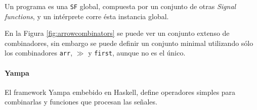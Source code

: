   Un programa es una \texttt{SF} global, compuesta por un conjunto
de otras \textit{Signal functions}, y un intérprete corre ésta instancia
global.

  En la Figura \ref{fig:arrowcombinators} se puede ver un conjunto
extenso de combinadores, sin embargo se
puede definir un conjunto minimal utilizando sólo
los combinadores \texttt{arr},
$\gg$ y \texttt{first}, aunque no es el único.

  \paragraph{Yampa}
  El framework Yampa \cite{yampa} embebido en Haskell, 
define operadores simples para combinarlas y funciones que
procesan las señales.


